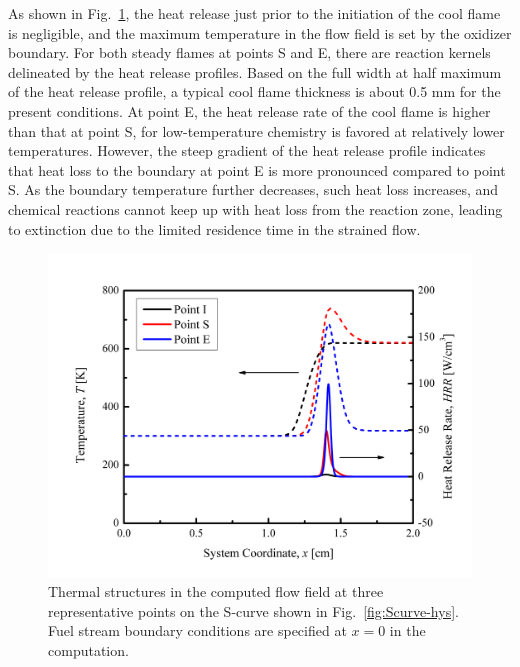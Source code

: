 As shown in Fig.~\ref{fig:NTC-HRR}, the heat release just prior to the initiation of the cool flame is negligible, and the maximum temperature in the flow field is set by the oxidizer boundary.  For both steady flames at points S and E, there are reaction kernels delineated by the heat release profiles.  Based on the full width at half maximum of the heat release profile, a typical cool flame thickness is about 0.5 mm for the present conditions.  At point E, the heat release rate of the cool flame is higher than that at point S, for low-temperature chemistry is favored at relatively lower temperatures.  However, the steep gradient of the heat release profile indicates that heat loss to the boundary at point E is more pronounced compared to point S.  As the boundary temperature further decreases, such heat loss increases, and chemical reactions cannot keep up with heat loss from the reaction zone, leading to extinction due to the limited residence time in the strained flow.

\begin{figure}[t]
  \centering
  \scriptsize
  \includegraphics[width=1.0\textwidth]{ch-NTC/HRR.png}
  \normalsize
  \caption{Thermal structures in the computed flow field at three representative points on the S-curve shown in Fig.~\ref{fig:Scurve-hys}.  Fuel stream boundary conditions are specified at $x=0$ in the computation.}
  \label{fig:NTC-HRR}
\end{figure}

